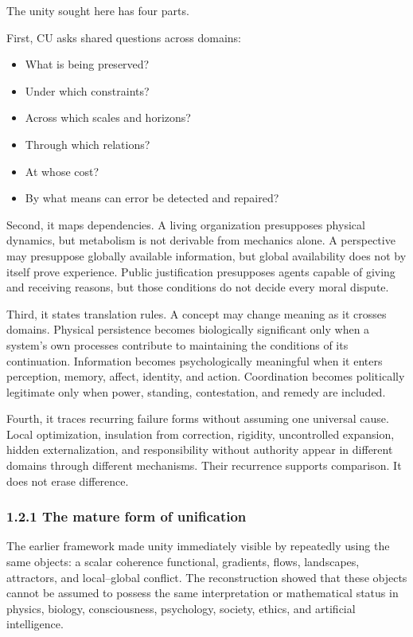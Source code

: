 \documentclass[
  11pt,
]{article}
\providecommand{\tightlist}{%
  \setlength{\itemsep}{0pt}\setlength{\parskip}{0pt}}
\begin{document}
The unity sought here has four parts.

First, CU asks shared questions across domains:

\begin{itemize}
\tightlist
\item
  What is being preserved?
\item
  Under which constraints?
\item
  Across which scales and horizons?
\item
  Through which relations?
\item
  At whose cost?
\item
  By what means can error be detected and repaired?
\end{itemize}

Second, it maps dependencies. A living organization presupposes physical
dynamics, but metabolism is not derivable from mechanics alone. A
perspective may presuppose globally available information, but global
availability does not by itself prove experience. Public justification
presupposes agents capable of giving and receiving reasons, but those
conditions do not decide every moral dispute.

Third, it states translation rules. A concept may change meaning as it
crosses domains. Physical persistence becomes biologically significant
only when a system's own processes contribute to maintaining the
conditions of its continuation. Information becomes psychologically
meaningful when it enters perception, memory, affect, identity, and
action. Coordination becomes politically legitimate only when power,
standing, contestation, and remedy are included.

Fourth, it traces recurring failure forms without assuming one universal
cause. Local optimization, insulation from correction, rigidity,
uncontrolled expansion, hidden externalization, and responsibility
without authority appear in different domains through different
mechanisms. Their recurrence supports comparison. It does not erase
difference.

\subsubsection{1.2.1 The mature form of
unification}\label{the-mature-form-of-unification}

The earlier framework made unity immediately visible by repeatedly using
the same objects: a scalar coherence functional, gradients, flows,
landscapes, attractors, and local--global conflict. The reconstruction
showed that these objects cannot be assumed to possess the same
interpretation or mathematical status in physics, biology,
consciousness, psychology, society, ethics, and artificial intelligence.
\end{document}

